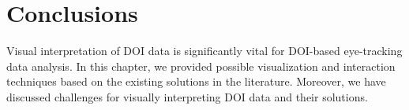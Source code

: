 \section{Conclusions}
Visual interpretation of DOI data is significantly vital for DOI-based eye-tracking data analysis. In this chapter, we provided possible visualization and interaction techniques based on the existing solutions in the literature. Moreover, we have discussed challenges for visually interpreting DOI data and their solutions. 
